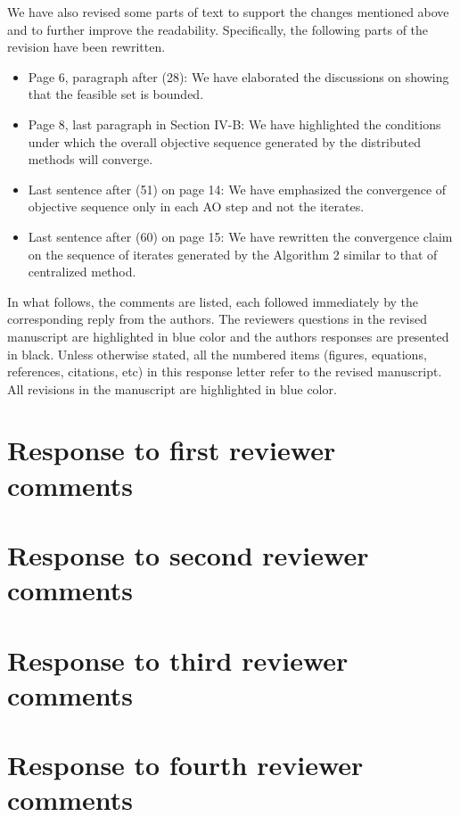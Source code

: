 \documentclass[10pt,letterpaper,onecolumn]{article}
\begin{document}
	
	We have  also revised some parts of text to support the changes mentioned above and to further improve the readability. Specifically, the following parts of the revision have been rewritten.
	\begin{itemize}
		\item Page 6, paragraph after (28): We have elaborated the discussions on showing that the feasible set is bounded.
		\item Page 8, last paragraph in Section IV-B: We have highlighted the conditions under which the overall objective sequence generated by the distributed methods will converge.
		\item Last sentence after (51) on page 14: We have emphasized the convergence of objective sequence only in each \ac{AO} step and not the iterates. 
		\item Last sentence after (60) on page 15: We have rewritten the convergence claim on the sequence of iterates generated by the Algorithm 2 similar to that of centralized method.
	\end{itemize}
	
	\vspace{1eM}
	In what follows, the comments are listed, each followed immediately by the corresponding reply from the authors. The reviewers questions in the revised manuscript are highlighted in blue color and the authors responses are presented in black. Unless otherwise stated, all the numbered items (figures, equations, references, citations, etc) in this response letter refer to the revised manuscript. All revisions in the manuscript are highlighted in blue color.
	\newpage
	\section*{Response to first reviewer comments}
	
	
	\newpage
	\section*{Response to second reviewer comments}
	
	
	\newpage
	\section*{Response to third reviewer comments}
	
	
	\newpage
	\section*{Response to fourth reviewer comments}
	
	
\end{document}
